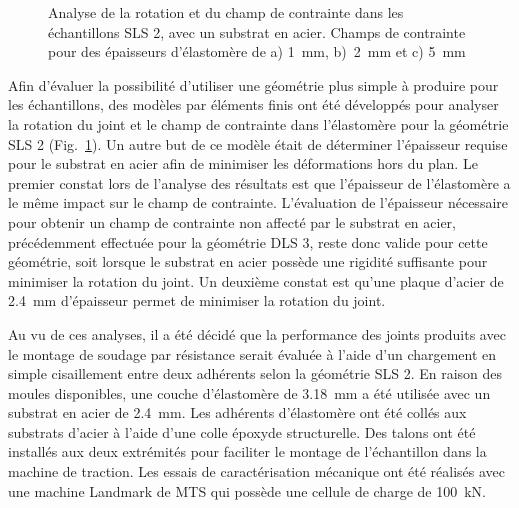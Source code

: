 \begin{figure}[h]
	\centering
	\qquad
	\caption{Analyse de la rotation et du champ de contrainte dans les échantillons SLS 2, avec un substrat en acier. Champs de contrainte pour des épaisseurs d'élastomère de a) \SI{1}{\milli\metre}, b)~\SI{2}{\milli\metre} et c) \SI{5}{\milli\metre}}
	\label{fig:SLS_metal}
\end{figure}

Afin d'évaluer la possibilité d'utiliser une géométrie plus simple à produire pour les échantillons, des modèles par éléments finis ont été développés pour analyser la rotation du joint et le champ de contrainte dans l'élastomère pour la géométrie SLS 2 (Fig.~\ref{fig:SLS_metal}). 
Un autre but de ce modèle était de déterminer l'épaisseur requise pour le substrat en acier afin de minimiser les déformations hors du plan.  
Le premier constat lors de l'analyse des résultats est que l'épaisseur de l'élastomère a le même impact sur le champ de contrainte. 
L'évaluation de l'épaisseur nécessaire pour obtenir un champ de contrainte non affecté par le substrat en acier, précédemment effectuée pour la géométrie DLS 3, reste donc valide pour cette géométrie, soit lorsque le substrat en acier possède une rigidité suffisante pour minimiser la rotation du joint. 
Un deuxième constat est qu'une plaque d'acier de \SI[locale=FR]{2.4}{\milli\metre} d'épaisseur permet de minimiser la rotation du joint. 

Au vu de ces analyses, il a été décidé que la performance des joints produits avec le montage de soudage par résistance serait évaluée à l'aide d'un chargement en simple cisaillement entre deux adhérents selon la géométrie SLS 2. 
En raison des moules disponibles, une couche d'élastomère de \SI[locale=FR]{3.18}{\milli\metre} a été utilisée avec un substrat en acier de \SI[locale=FR]{2.4}{\milli\metre}. 
Les adhérents d'élastomère ont été collés aux substrats d'acier à l'aide d'une colle époxyde structurelle. 
Des talons ont été installés aux deux extrémités pour faciliter le montage de l'échantillon dans la machine de traction. 
Les essais de caractérisation mécanique ont été réalisés avec une machine Landmark de MTS qui possède une cellule de charge de \SI[locale=FR]{100}{\kilo\newton}. 

